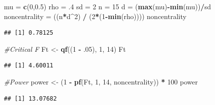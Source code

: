 \documentclass[
]{book}
\newenvironment{Shaded}{\begin{snugshade}}{\end{snugshade}}
\newcommand{\CommentTok}[1]{\textcolor[rgb]{0.56,0.35,0.01}{\textit{#1}}}
\newcommand{\DecValTok}[1]{\textcolor[rgb]{0.00,0.00,0.81}{#1}}
\newcommand{\FloatTok}[1]{\textcolor[rgb]{0.00,0.00,0.81}{#1}}
\newcommand{\KeywordTok}[1]{\textcolor[rgb]{0.13,0.29,0.53}{\textbf{#1}}}
\newcommand{\NormalTok}[1]{#1}
\newcommand{\OperatorTok}[1]{\textcolor[rgb]{0.81,0.36,0.00}{\textbf{#1}}}
\newcommand{\StringTok}[1]{\textcolor[rgb]{0.31,0.60,0.02}{#1}}
\begin{document}
\begin{Shaded}
\begin{Highlighting}[]
\NormalTok{mu =}\StringTok{ }\KeywordTok{c}\NormalTok{(}\DecValTok{0}\NormalTok{,}\FloatTok{0.5}\NormalTok{)}
\NormalTok{rho =}\StringTok{ }\FloatTok{.4}
\NormalTok{sd =}\StringTok{ }\DecValTok{2}
\NormalTok{n =}\StringTok{ }\DecValTok{15}
\NormalTok{d =}\StringTok{ }\NormalTok{(}\KeywordTok{max}\NormalTok{(mu)}\OperatorTok{-}\KeywordTok{min}\NormalTok{(mu))}\OperatorTok{/}\NormalTok{sd}
\NormalTok{noncentrality =}\StringTok{ }\NormalTok{((n}\OperatorTok{*}\NormalTok{d}\OperatorTok{^}\DecValTok{2}\NormalTok{) }\OperatorTok{/}\StringTok{ }\NormalTok{(}\DecValTok{2}\OperatorTok{*}\NormalTok{(}\DecValTok{1}\OperatorTok{-}\KeywordTok{min}\NormalTok{(rho))))}
\NormalTok{noncentrality}
\end{Highlighting}
\end{Shaded}

\begin{verbatim}
## [1] 0.78125
\end{verbatim}

\begin{Shaded}
\begin{Highlighting}[]
\CommentTok{#Critical F}
\NormalTok{Ft <-}\StringTok{ }\KeywordTok{qf}\NormalTok{((}\DecValTok{1} \OperatorTok{-}\StringTok{ }\FloatTok{.05}\NormalTok{), }\DecValTok{1}\NormalTok{, }\DecValTok{14}\NormalTok{)}
\NormalTok{Ft}
\end{Highlighting}
\end{Shaded}

\begin{verbatim}
## [1] 4.60011
\end{verbatim}

\begin{Shaded}
\begin{Highlighting}[]
\CommentTok{#Power}
\NormalTok{power <-}\StringTok{ }\NormalTok{(}\DecValTok{1} \OperatorTok{-}\StringTok{ }\KeywordTok{pf}\NormalTok{(Ft,}
                 \DecValTok{1}\NormalTok{,}
                 \DecValTok{14}\NormalTok{,}
\NormalTok{                 noncentrality)) }\OperatorTok{*}\StringTok{ }\DecValTok{100}
\NormalTok{power}
\end{Highlighting}
\end{Shaded}

\begin{verbatim}
## [1] 13.07682
\end{verbatim}

\newpage
\end{document}
